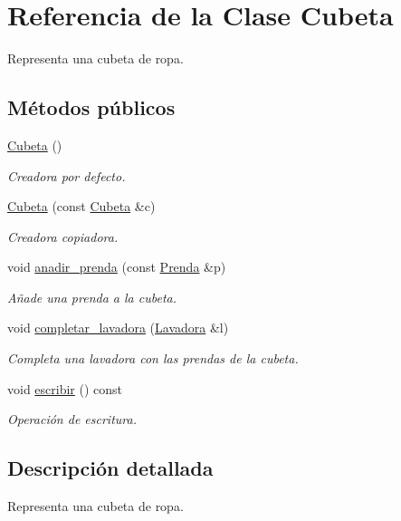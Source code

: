 \hypertarget{class_cubeta}{\section{Referencia de la Clase Cubeta}
\label{class_cubeta}
}


Representa una cubeta de ropa.  


\subsection*{Métodos públicos}
\begin{DoxyCompactItemize}
\item 
\hyperlink{class_cubeta_ae85e70c9cd67454446439891e3f435e1}{Cubeta} ()
\begin{DoxyCompactList}\small\item\em Creadora por defecto. \end{DoxyCompactList}\item 
\hyperlink{class_cubeta_a9615e48038899c5732f61661585f12c7}{Cubeta} (const \hyperlink{class_cubeta}{Cubeta} \&c)
\begin{DoxyCompactList}\small\item\em Creadora copiadora. \end{DoxyCompactList}\item 
void \hyperlink{class_cubeta_a431873df8f99cebe56b4787a5271e395}{anadir\+\_\+prenda} (const \hyperlink{class_prenda}{Prenda} \&p)
\begin{DoxyCompactList}\small\item\em Añade una prenda a la cubeta. \end{DoxyCompactList}\item 
void \hyperlink{class_cubeta_a3586257f2f2eacefc47714c6a3a01875}{completar\+\_\+lavadora} (\hyperlink{class_lavadora}{Lavadora} \&l)
\begin{DoxyCompactList}\small\item\em Completa una lavadora con las prendas de la cubeta. \end{DoxyCompactList}\item 
void \hyperlink{class_cubeta_a878904c34f1b3361c3913bbaf735ed12}{escribir} () const 
\begin{DoxyCompactList}\small\item\em Operación de escritura. \end{DoxyCompactList}\end{DoxyCompactItemize}


\subsection{Descripción detallada}
Representa una cubeta de ropa. 

